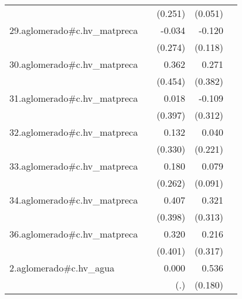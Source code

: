 {\begin{longtable}{l*{4}{D{.}{.}{-1}}}
            &                     &     (0.251)         &     (0.051)         &                     \\
\addlinespace
29.aglomerado#c.hv\_matpreca&                     &      -0.034         &      -0.120         &                     \\
            &                     &     (0.274)         &     (0.118)         &                     \\
\addlinespace
30.aglomerado#c.hv\_matpreca&                     &       0.362         &       0.271         &                     \\
            &                     &     (0.454)         &     (0.382)         &                     \\
\addlinespace
31.aglomerado#c.hv\_matpreca&                     &       0.018         &      -0.109         &                     \\
            &                     &     (0.397)         &     (0.312)         &                     \\
\addlinespace
32.aglomerado#c.hv\_matpreca&                     &       0.132         &       0.040         &                     \\
            &                     &     (0.330)         &     (0.221)         &                     \\
\addlinespace
33.aglomerado#c.hv\_matpreca&                     &       0.180         &       0.079         &                     \\
            &                     &     (0.262)         &     (0.091)         &                     \\
\addlinespace
34.aglomerado#c.hv\_matpreca&                     &       0.407         &       0.321         &                     \\
            &                     &     (0.398)         &     (0.313)         &                     \\
\addlinespace
36.aglomerado#c.hv\_matpreca&                     &       0.320         &       0.216         &                     \\
            &                     &     (0.401)         &     (0.317)         &                     \\
\addlinespace
2.aglomerado#c.hv\_agua&                     &       0.000         &       0.536\sym{**} &                     \\
            &                     &         (.)         &     (0.180)         &                     \\

\end{longtable}}
